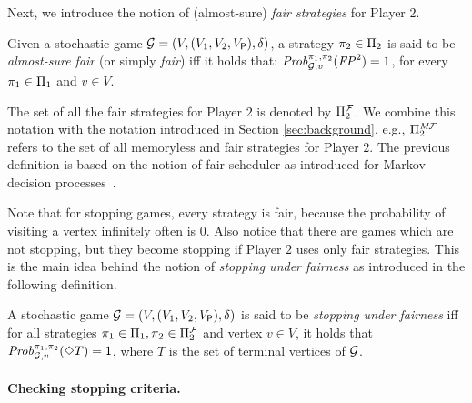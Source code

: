 	Next, we introduce the notion of  (almost-sure) \emph{fair strategies} for Player $2$.
\begin{definition} Given a stochastic game $\mathcal{G} = (V, (V_1, V_2, V_{\mathsf{P}}), \delta)$,
a strategy $\pi_{2} \in \Pi_{2}$ is said to be \emph{almost-sure fair} (or simply \emph{fair}) iff it holds that:
$\mathit{Prob}^{\pi_{1}, \pi_{2}}_{\mathcal{G},v}(\mathit{FP}^2) = 1$,
for every $\pi_{1} \in \Pi_{1}$ and $v \in V$. 
\end{definition}
%
The set of all the  fair strategies for Player $2$ is denoted by $\Pi^{\mathcal{F}}_{2}$. We combine this notation  with the notation introduced in Section \ref{sec:background}, e.g., $\Pi^{\textit{M}\mathcal{F}}_{2}$ refers to the set of all  memoryless and fair strategies for Player $2$. 
%
The previous definition is based on the notion of fair scheduler as introduced for Markov decision processes~\cite{DBLP:journals/dc/BaierK98,BaierK08}.

Note that for stopping games, every strategy is fair, because the probability of visiting a vertex infinitely often is $0$.
%
Also notice that there are games which are not stopping, but they become stopping if Player $2$ uses only fair strategies. This is the main idea behind the notion of \emph{stopping under fairness} as introduced in the following definition.
	
\begin{definition}\label{def:stopping-under-fairness}
  A stochastic game $\mathcal{G} = (V, (V_1, V_2, V_{\mathsf{P}}), \delta)$ is said  to be \emph{stopping under fairness} iff for all strategies $\pi_{1} \in \Pi_{1}, \pi_{2} \in \Pi^{\mathcal{F}}_{2}$ and vertex $v \in V$, it holds that
  $\mathit{Prob}^{\pi_{1}, \pi_{2}}_{\mathcal{G},v}(\Diamond T)=1$,  where $T$ is the set of terminal vertices of $\mathcal{G}$. 
\end{definition}


\paragraph{Checking stopping criteria.}

